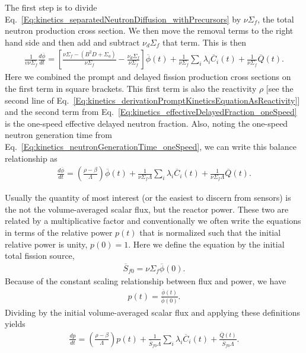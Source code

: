 The first step is to divide Eq.~\eqref{Eq:kinetics_separatedNeutronDiffusion_withPrecursors} by $\nu \Sigma_f$, the total neutron production cross section. We then move the removal terms to the right hand side and then add and subtract $\nu_d \Sigma_f$ that term. This is then
\begin{align}
  \frac{1}{v \nu\Sigma_f} \frac{d\overline{\phi}}{dt} = \left[ \frac{ \nu \Sigma_f - ( B^2 D + \Sigma_a ) }{ \nu \Sigma_f } - \frac{ \nu_d \Sigma_f }{ \nu \Sigma_f } \right] \overline{\phi}(t) + \frac{1}{\nu\Sigma_f} \sum_i \lambda_i \overline{C}_i(t) + \frac{1}{\nu\Sigma_f} \overline{Q}(t). \nonumber
\end{align}
Here we combined the prompt and delayed fission production cross sections on the first term in square brackets. This first term is also the reactivity $\rho$ [see the second line of Eq.~\eqref{Eq:kinetics_derivationPromptKineticsEquationAsReactivity}] and the second term from Eq.~\eqref{Eq:kinetics_effectiveDelayedFraction_oneSpeed} is the one-speed effective delayed neutron fraction. Also, noting the one-speed neutron generation time from Eq.~\eqref{Eq:kinetics_neutronGenerationTime_oneSpeed}, we can write this balance relationship as
\begin{align}
   \frac{d\overline{\phi}}{dt} = \left( \frac{ \rho - \beta }{ \Lambda } \right) \overline{\phi}(t) + \frac{1}{\nu\Sigma_f \Lambda} \sum_i \lambda_i \overline{C}_i(t) + \frac{1}{\nu\Sigma_f \Lambda} \overline{Q}(t).
\end{align}

Usually the quantity of most interest (or the easiest to discern from sensors) is the not the volume-averaged scalar flux, but the reactor power. These two are related by a multiplicative factor and conventionally we often write the equations in terms of the relative power $p(t)$ that is normalized such that the initial relative power is unity, $p(0) = 1$. Here we define the equation by the initial total fission source,
\begin{align}
  \overline{S}_{f0} = \nu \Sigma_f \overline{\phi}(0) .
\end{align}
Because of the constant scaling relationship between flux and power, we have
\begin{align}
  p(t) = \frac{ \overline{\phi}(t) }{ \overline{\phi}(0) }.
\end{align}
Dividing by the initial volume-averaged scalar flux and applying these definitions yields
\begin{align}
   \frac{dp}{dt} = \left( \frac{ \rho - \beta }{ \Lambda } \right) p(t) + \frac{1}{\overline{S}_{f0} \Lambda} \sum_i \lambda_i \overline{C}_i(t) + \frac{\overline{Q}(t)}{\overline{S}_{f0} \Lambda} .
\end{align}

